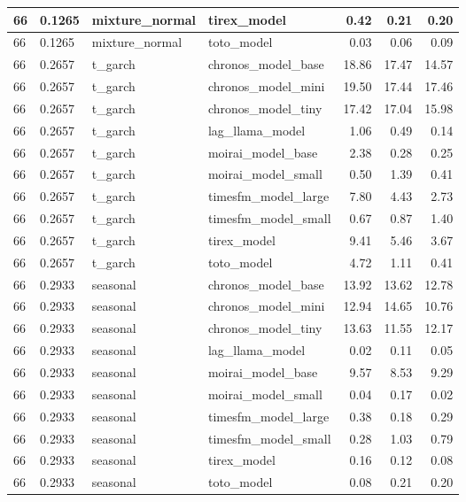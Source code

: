 {\begin{tabular}{llllrrr}
\midrule
66 & 0.1265 & mixture\_normal & tirex\_model & 0.42 & 0.21 & 0.20 \\
\midrule
66 & 0.1265 & mixture\_normal & toto\_model & 0.03 & 0.06 & 0.09 \\
\midrule
66 & 0.2657 & t\_garch & chronos\_model\_base & 18.86 & 17.47 & 14.57 \\
\midrule
66 & 0.2657 & t\_garch & chronos\_model\_mini & 19.50 & 17.44 & 17.46 \\
\midrule
66 & 0.2657 & t\_garch & chronos\_model\_tiny & 17.42 & 17.04 & 15.98 \\
\midrule
66 & 0.2657 & t\_garch & lag\_llama\_model & 1.06 & 0.49 & 0.14 \\
\midrule
66 & 0.2657 & t\_garch & moirai\_model\_base & 2.38 & 0.28 & 0.25 \\
\midrule
66 & 0.2657 & t\_garch & moirai\_model\_small & 0.50 & 1.39 & 0.41 \\
\midrule
66 & 0.2657 & t\_garch & timesfm\_model\_large & 7.80 & 4.43 & 2.73 \\
\midrule
66 & 0.2657 & t\_garch & timesfm\_model\_small & 0.67 & 0.87 & 1.40 \\
\midrule
66 & 0.2657 & t\_garch & tirex\_model & 9.41 & 5.46 & 3.67 \\
\midrule
66 & 0.2657 & t\_garch & toto\_model & 4.72 & 1.11 & 0.41 \\
\midrule
66 & 0.2933 & seasonal & chronos\_model\_base & 13.92 & 13.62 & 12.78 \\
\midrule
66 & 0.2933 & seasonal & chronos\_model\_mini & 12.94 & 14.65 & 10.76 \\
\midrule
66 & 0.2933 & seasonal & chronos\_model\_tiny & 13.63 & 11.55 & 12.17 \\
\midrule
66 & 0.2933 & seasonal & lag\_llama\_model & 0.02 & 0.11 & 0.05 \\
\midrule
66 & 0.2933 & seasonal & moirai\_model\_base & 9.57 & 8.53 & 9.29 \\
\midrule
66 & 0.2933 & seasonal & moirai\_model\_small & 0.04 & 0.17 & 0.02 \\
\midrule
66 & 0.2933 & seasonal & timesfm\_model\_large & 0.38 & 0.18 & 0.29 \\
\midrule
66 & 0.2933 & seasonal & timesfm\_model\_small & 0.28 & 1.03 & 0.79 \\
\midrule
66 & 0.2933 & seasonal & tirex\_model & 0.16 & 0.12 & 0.08 \\
\midrule
66 & 0.2933 & seasonal & toto\_model & 0.08 & 0.21 & 0.20 \\
\midrule

\end{tabular}}
